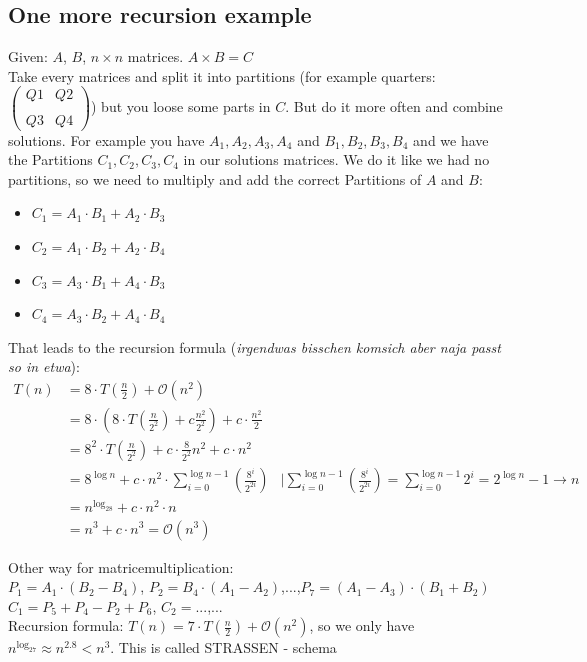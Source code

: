 \subsection{One more recursion example}

Given: $A$, $B$, $n \times n$ matrices. $A \times B = C$ \\
Take every matrices and split it into partitions (for example quarters: $\begin{pmatrix}Q1&Q2\\\\Q3&Q4\end{pmatrix}$) but you loose some parts in $C$. But do it more often and combine solutions. For example you have $A_1,A_2,A_3,A_4$ and $B_1,B_2,B_3,B_4$ and we have the Partitions $C_1,C_2,C_3,C_4$ in our solutions matrices. We do it like we had no partitions, so we need to multiply and add the correct Partitions of $A$ and $B$:
\begin{itemize}
\item $C_1 = A_1 \cdot B_1 + A_2 \cdot B_3$
\item  $C_2 = A_1 \cdot B_2 + A_2 \cdot B_4$
\item  $C_3 = A_3 \cdot B_1 + A_4 \cdot B_3$
\item  $C_4 = A_3 \cdot B_2 + A_4 \cdot B_4$
\end{itemize}
That leads to the recursion formula (\textit{irgendwas bisschen komsich aber naja passt so in etwa}): \\

\begin{align*}
T(n) &= 8 \cdot T\left(\frac{n}{2}\right)+\mathcal{O}(n^2) \\
&= 8 \cdot\left(8 \cdot T\left(\frac{n}{2^2}\right) + c\frac{n^2}{2^2} \right) + c \cdot\frac{n^2}{2} \\
&= 8^2 \cdot T\left(\frac{n}{2^2}\right) + c \cdot\frac{8}{2^2}n^2 + c \cdot n^2 \\
&= 8^{\log n} + c \cdot n^2 \cdot\sum_{i=0}^{\log n -1}\left(\frac{8^i}{2^{2i}}\right) & | \sum_{i=0}^{\log n -1}\left(\frac{8^i}{2^{2i}}\right) = \sum_{i=0}^{\log n -1} 2^i = 2^{\log n} -1  \rightarrow  n\\
&= n^{\log_28} + c \cdot n^2 \cdot n \\
&= n^3 +  c  \cdot n^3 = \mathcal{O}(n^3)
\end{align*}

Other way for matricemultiplication: \\
$P_1 = A_1 \cdot (B_2 - B_4)$, $P_2 = B_4 \cdot(A_1-A_2)$,...,$P_7=(A_1-A_3) \cdot (B_1 + B_2)$ \\
$C_1 = P_5 + P_4 - P_2 + P_6$, $C_2=...$,... \\
Recursion formula: $T(n) = 7 \cdot T\left(\frac{n}{2}\right) + \mathcal{O}(n^2)$, so we only have $n^{\log_27} \approx n^{2.8} < n^3$. This is called STRASSEN - schema

